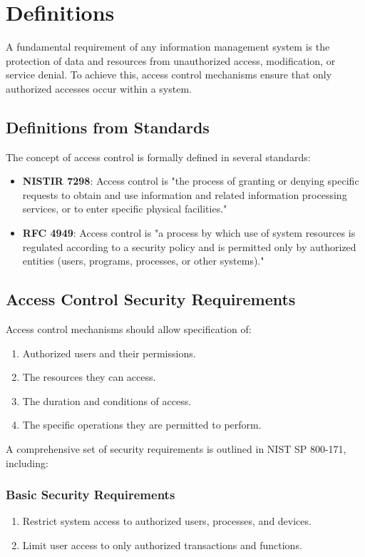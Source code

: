 \chapter{Definitions}
A fundamental requirement of any information management system is the
protection of data and resources from unauthorized access,
modification, or service denial. To achieve this, access control
mechanisms ensure that only authorized accesses occur within a system.

\section{Definitions from Standards}
The concept of access control is formally defined in several standards:

\begin{itemize}
    \item \textbf{NISTIR 7298}: Access control is "the process of
      granting or denying specific requests to obtain and use
      information and related information processing services, or to
      enter specific physical facilities."
    \item \textbf{RFC 4949}: Access control is "a process by which use
      of system resources is regulated according to a security policy
      and is permitted only by authorized entities (users, programs,
      processes, or other systems)."
\end{itemize}

\section{Access Control Security Requirements}
Access control mechanisms should allow specification of:

\begin{enumerate}
    \item Authorized users and their permissions.
    \item The resources they can access.
    \item The duration and conditions of access.
    \item The specific operations they are permitted to perform.
\end{enumerate}

A comprehensive set of security requirements is outlined in NIST SP 800-171, including:

\subsection{Basic Security Requirements}
\begin{enumerate}
    \item Restrict system access to authorized users, processes, and devices.
    \item Limit user access to only authorized transactions and functions.
\end{enumerate}

